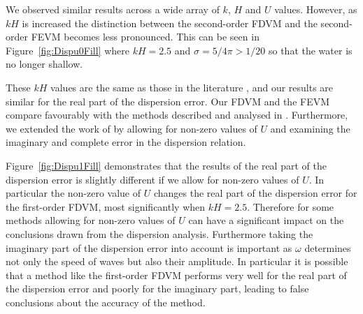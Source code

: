 We observed similar results across a wide array of $k$, $H$ and $U$ values. However, as $kH$ is increased the distinction between the second-order FDVM and the second-order FEVM becomes less pronounced. This can be seen in Figure~\ref{fig:Dispu0Fill} where $kH = 2.5$ and $\sigma = 5/4 \pi > 1/20$ so that the water is no longer shallow.

These $kH$ values are the same as those in the literature \cite{Filippini-etal-2016-381}, and our results are similar for the real part of the dispersion error. Our FDVM and the FEVM compare favourably with the methods described and analysed in \cite{Filippini-etal-2016-381}. Furthermore, we extended the work of \cite{Filippini-etal-2016-381} by allowing for non-zero values of $U$ and examining the imaginary and complete error in the dispersion relation. 

Figure~\ref{fig:Dispu1Fill} demonstrates that the results of the real part of the dispersion error  is slightly different if we allow for non-zero values of $U$. In particular the non-zero value of $U$ changes the real part of the dispersion error for the first-order FDVM, most significantly when $kH = 2.5$. Therefore for some methods allowing for non-zero values of $U$ can have a significant impact on the conclusions drawn from the dispersion analysis. Furthermore taking the imaginary part of the dispersion error into account is important as $\omega$ determines not only the speed of waves but also their amplitude. In particular it is possible that a method like the first-order FDVM performs very well for the real part of the dispersion error and poorly for the imaginary part, leading to false conclusions about the accuracy of the method.


